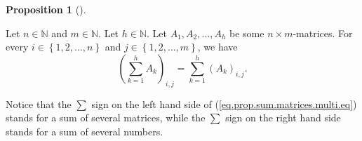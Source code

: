 \documentclass[numbers=enddot,12pt,final,onecolumn,notitlepage]{scrartcl}%
\theoremstyle{definition}
\newtheorem{prop}[theo]{Proposition}
\newenvironment{proposition}[1][]
{\begin{prop}[#1]\begin{leftbar}}
{\end{leftbar}\end{prop}}
\let\sumnonlimits\sum
\renewcommand{\sum}{\sumnonlimits\limits}
\begin{document}
\begin{proposition}
\label{prop.sum.matrices.multi}Let $n\in\mathbb{N}$ and $m\in\mathbb{N}$. Let
$h\in\mathbb{N}$. Let $A_{1},A_{2},\ldots,A_{h}$ be some $n\times m$-matrices.
For every $i\in\left\{  1,2,\ldots,n\right\}  $ and $j\in\left\{
1,2,\ldots,m\right\}  $, we have%
\begin{equation}
\left(  \sum_{k=1}^{h}A_{k}\right)  _{i,j}=\sum_{k=1}^{h}\left(  A_{k}\right)
_{i,j}. \label{eq.prop.sum.matrices.multi.eq}%
\end{equation}

\end{proposition}

Notice that the $\sum$ sign on the left hand side of
(\ref{eq.prop.sum.matrices.multi.eq}) stands for a sum of several matrices,
while the $\sum$ sign on the right hand side stands for a sum of several numbers.
\end{document}
